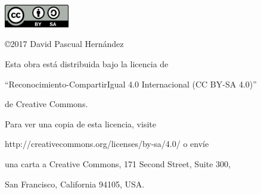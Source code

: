 \begin{flushright}
	
	\includegraphics[height=1.0cm]{figures/CC-BY-SA.png}
	
	\vspace*{0.5cm}
	
	\copyright 2017 David Pascual Hernández
	
	\vspace*{0.3cm}
	
	Esta obra está distribuida bajo la licencia de 
	
	``Reconocimiento-CompartirIgual 4.0 Internacional (CC BY-SA 4.0)''
	
	de Creative Commons.
	
	\vspace{0.2cm}
	
	Para ver una copia de esta licencia, visite
	
	http://creativecommons.org/licenses/by-sa/4.0/ o envíe
	
	una carta a Creative Commons, 171 Second Street, Suite 300,
	
	San Francisco, California 94105, USA.
	
\end{flushright}